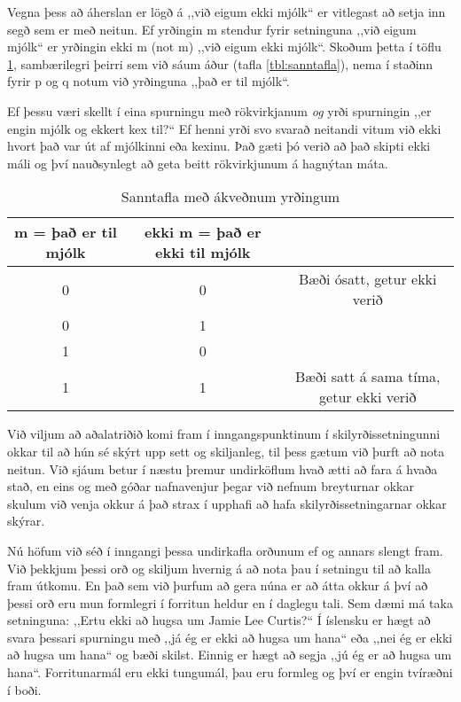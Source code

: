 Vegna þess að áherslan er lögð á ,,við eigum ekki mjólk“ er vitlegast að setja inn segð sem er með neitun.
Ef yrðingin m stendur fyrir setninguna ,,við eigum mjólk“ er yrðingin ekki m (not m) ,,við eigum ekki mjólk“.
Skoðum þetta í töflu \ref{tbl:sanntafla-kaffi}, sambærilegri þeirri sem við sáum áður (tafla \ref{tbl:sanntafla}), nema í staðinn fyrir p og q notum við yrðinguna ,,það er til mjólk“.

Ef þessu væri skellt í eina spurningu með rökvirkjanum \emph{og} yrði spurningin ,,er engin mjólk og ekkert kex til?“
Ef henni yrði svo svarað neitandi vitum við ekki hvort það var út af mjólkinni eða kexinu.
Það gæti þó verið að það skipti ekki máli og því nauðsynlegt að geta beitt rökvirkjunum á hagnýtan máta.

\begin{center}
	\centering
	\begin{table}[H]
		\centering
		\caption{Sanntafla með ákveðnum yrðingum}
		\vspace{3pt}
		\label{tbl:sanntafla-kaffi}
		\begin{tabular}{|c | c| c |}
			m = það er til mjólk & ekki m = það er ekki til mjólk\\ 
			\hline  
			0 & 0 & Bæði ósatt, getur ekki verið\\
			0 & 1 &\\
			1 & 0 &\\
			1 & 1 & Bæði satt á sama tíma, getur ekki verið\\
			\hline
		\end{tabular}
		
	\end{table}
\end{center}
Við viljum að aðalatriðið komi fram í inngangspunktinum í skilyrðissetningunni okkar til að hún sé skýrt upp sett og skiljanleg, til þess gætum við þurft að nota neitun.
Við sjáum betur í næstu þremur undirköflum hvað ætti að fara á hvaða stað, en eins og með góðar nafnavenjur þegar við nefnum breyturnar okkar skulum við venja okkur á það strax í upphafi að hafa skilyrðissetningarnar okkar skýrar.

Nú höfum við séð í inngangi þessa undirkafla orðunum ef og annars slengt fram.
Við þekkjum þessi orð og skiljum hvernig á að nota þau í setningu til að kalla fram útkomu.
En það sem við þurfum að gera núna er að átta okkur á því að þessi orð eru mun formlegri í forritun heldur en í daglegu tali.
Sem dæmi má taka setninguna: ,,Ertu ekki að hugsa um Jamie Lee Curtis?“
Í íslensku er hægt að svara þessari spurningu með ,,já ég er ekki að hugsa um hana“ eða ,,nei ég er ekki að hugsa um hana“ og bæði skilst.
Einnig er hægt að segja ,,jú ég er að hugsa um hana“.
Forritunarmál eru ekki tungumál, þau eru formleg og því er engin tvíræðni í boði.


